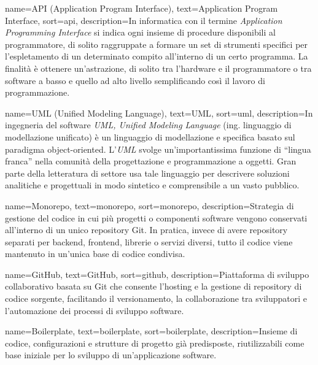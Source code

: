 
 {
    name={API (Application Program Interface)},
    text={Application Program Interface},
    sort={api},
    description={In informatica con il termine \emph{Application Programming Interface} si indica ogni insieme di procedure disponibili al programmatore, di solito raggruppate a formare un set di strumenti specifici per l'espletamento di un determinato compito all'interno di un certo programma. La finalità è ottenere un'astrazione, di solito tra l'hardware e il programmatore o tra software a basso e quello ad alto livello semplificando così il lavoro di programmazione.}
}

 {
    name={UML (Unified Modeling Language)},
    text={UML},
    sort={uml},
    description={In ingegneria del software \emph{UML, Unified Modeling Language} (ing. linguaggio di modellazione unificato) è un linguaggio di modellazione e specifica basato sul paradigma object-oriented. L'\emph{UML} svolge un'importantissima funzione di ``lingua franca'' nella comunità della progettazione e programmazione a oggetti. Gran parte della letteratura di settore usa tale linguaggio per descrivere soluzioni analitiche e progettuali in modo sintetico e comprensibile a un vasto pubblico.}
}

 {
    name={Monorepo},
    text={monorepo},
    sort={monorepo},
    description={Strategia di gestione del codice in cui più progetti o componenti software vengono conservati all'interno di un unico repository Git. In pratica, invece di avere repository separati per backend, frontend, librerie o servizi diversi, tutto il codice viene mantenuto in un'unica base di codice condivisa.}
}

 {
    name={GitHub},
    text={GitHub},
    sort={github},
    description={Piattaforma di sviluppo collaborativo basata su Git che consente l'hosting e la gestione di repository di codice sorgente, facilitando il versionamento, la collaborazione tra sviluppatori e l'automazione dei processi di sviluppo software.}
}

 {
    name={Boilerplate},
    text={boilerplate},
    sort={boilerplate},
    description={Insieme di codice, configurazioni e strutture di progetto già predisposte, riutilizzabili come base iniziale per lo sviluppo di un'applicazione software.}
}


